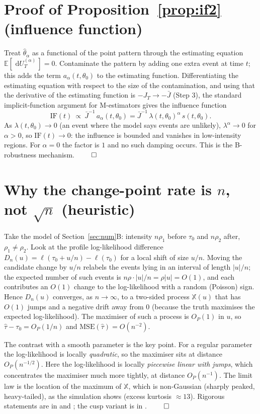 \documentclass[11pt]{article}
\newcommand{\dd}{\,\mathrm{d}}
\newcommand{\E}{\mathbb{E}}
\begin{document}
\section{Proof of Proposition~\ref{prop:if2} (influence function)}
\label{app:if}
Treat $\hat\theta_\alpha$ as a functional of the point pattern through the
estimating equation $\E[\,\dd U_T^{(\alpha)}\,]=0$. Contaminate the pattern by
adding one extra event at time $t$; this adds the term $a_\alpha(t,\theta_0)$ to
the estimating function. Differentiating the estimating equation with respect to
the size of the contamination, and using that the derivative of the estimating
function is $-J_T\to-\bar J$ (Step 3), the standard implicit-function argument for
M-estimators gives the influence function
\[
\mathrm{IF}(t)\ \propto\ \bar J^{-1}\,a_\alpha(t,\theta_0)
=\bar J^{-1}\,\lambda(t,\theta_0)^{\alpha}\,s(t,\theta_0).
\]
As $\lambda(t,\theta_0)\to0$ (an event where the model says events are unlikely),
$\lambda^{\alpha}\to0$ for $\alpha>0$, so $\mathrm{IF}(t)\to0$: the influence is
bounded and vanishes in low-intensity regions. For $\alpha=0$ the factor is $1$ and
no such damping occurs. This is the B-robustness mechanism. $\qed$

\section{Why the change-point rate is $n$, not $\sqrt n$ (heuristic)}
\label{app:cp}
Take the model of Section~\ref{sec:num}B: intensity $n\rho_1$ before $\tau_0$ and
$n\rho_2$ after, $\rho_1\neq\rho_2$. Look at the profile log-likelihood difference
$D_n(u)=\ell(\tau_0+u/n)-\ell(\tau_0)$ for a local shift of size $u/n$. Moving the
candidate change by $u/n$ relabels the events lying in an interval of length
$|u|/n$; the expected number of such events is $n\rho\cdot|u|/n=\rho|u|=O(1)$, and
each contributes an $O(1)$ change to the log-likelihood with a random (Poisson)
sign. Hence $D_n(u)$ converges, as $n\to\infty$, to a two-sided process
$\mathbb X(u)$ that has $O(1)$ jumps and a negative drift away from $0$ (because the
truth maximises the expected log-likelihood). The maximiser of such a process is
$O_P(1)$ in $u$, so $\hat\tau-\tau_0=O_P(1/n)$ and $\mathrm{MSE}(\hat\tau)=O(n^{-2})$.

The contrast with a smooth parameter is the key point. For a regular parameter the
log-likelihood is locally \emph{quadratic}, so the maximiser sits at distance
$O_P(n^{-1/2})$. Here the log-likelihood is locally \emph{piecewise linear with
jumps}, which concentrates the maximiser much more tightly, at distance
$O_P(n^{-1})$. The limit law is the location of the maximum of $\mathbb X$, which is
non-Gaussian (sharply peaked, heavy-tailed), as the simulation shows (excess
kurtosis $\approx13$). Rigorous statements are in \citet{kutoyants1998} and
\citet{ih1981}; the cusp variant is in \citet{dachian2003}. $\qed$
\end{document}
